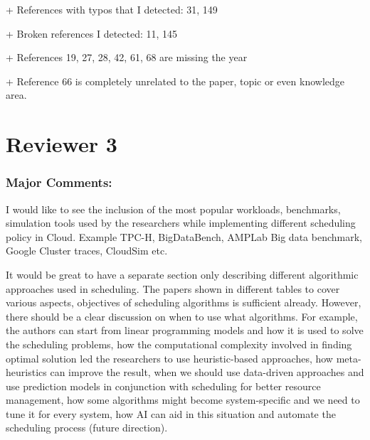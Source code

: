 
+ References with typos that I detected: 31, 149


+ Broken references I detected: 11, 145


+ References 19, 27, 28, 42, 61, 68 are missing the year



+ Reference 66 is completely unrelated to the paper, topic or even
knowledge area.



\section{Reviewer 3}

\subsubsection{Major Comments:}

I would like to see the inclusion of the most popular workloads,
benchmarks, simulation tools used by the researchers while
implementing different scheduling policy in Cloud. Example TPC-H,
BigDataBench, AMPLab Big data benchmark, Google Cluster traces,
CloudSim etc.


It would be great to have a separate section only describing different
algorithmic approaches used in scheduling. The papers shown in
different tables to cover various aspects, objectives of scheduling
algorithms is sufficient already. However, there should be a clear
discussion on when to use what algorithms. For example, the authors
can start from linear programming models and how it is used to solve
the scheduling problems, how the computational complexity involved in
finding optimal solution led the researchers to use heuristic-based
approaches, how meta-heuristics can improve the result, when we should
use data-driven approaches and use prediction models in conjunction
with scheduling for better resource management, how some algorithms
might become system-specific and we need to tune it for every system,
how AI can aid in this situation and automate the scheduling process
(future direction).

